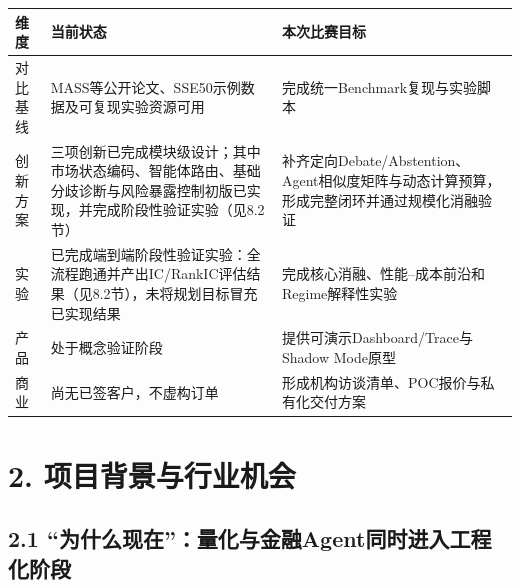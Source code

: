 \documentclass[12pt,a4paper]{ctexart}
\begin{document}
\begin{longtable}[]{@{}
  >{\raggedright\arraybackslash}p{}
  >{\raggedright\arraybackslash}p{}
  >{\raggedright\arraybackslash}p{}@{}}
\toprule\noalign{}
\begin{minipage}[b]{\linewidth}\centering
\textbf{维度}
\end{minipage} & \begin{minipage}[b]{\linewidth}\centering
\textbf{当前状态}
\end{minipage} & \begin{minipage}[b]{\linewidth}\centering
\textbf{本次比赛目标}
\end{minipage} \\
\midrule\noalign{}
\endhead
\bottomrule\noalign{}
\endlastfoot
对比基线 & MASS等公开论文、SSE50示例数据及可复现实验资源可用 &
完成统一Benchmark复现与实验脚本 \\
创新方案 &
三项创新已完成模块级设计；其中市场状态编码、智能体路由、基础分歧诊断与风险暴露控制初版已实现，并完成阶段性验证实验（见8.2节）
&
补齐定向Debate/Abstention、Agent相似度矩阵与动态计算预算，形成完整闭环并通过规模化消融验证 \\
实验 &
已完成端到端阶段性验证实验：全流程跑通并产出IC/RankIC评估结果（见8.2节），未将规划目标冒充已实现结果
& 完成核心消融、性能--成本前沿和Regime解释性实验 \\
产品 & 处于概念验证阶段 & 提供可演示Dashboard/Trace与Shadow Mode原型 \\
商业 & 尚无已签客户，不虚构订单 &
形成机构访谈清单、POC报价与私有化交付方案 \\
\end{longtable}

\section{\texorpdfstring{\textbf{2.
项目背景与行业机会}}{2. 项目背景与行业机会}}\label{ux9879ux76eeux80ccux666fux4e0eux884cux4e1aux673aux4f1a}

\subsection{\texorpdfstring{\textbf{2.1
``为什么现在''：量化与金融Agent同时进入工程化阶段}}{2.1 ``为什么现在''：量化与金融Agent同时进入工程化阶段}}\label{ux4e3aux4ec0ux4e48ux73b0ux5728ux91cfux5316ux4e0eux91d1ux878dagentux540cux65f6ux8fdbux5165ux5de5ux7a0bux5316ux9636ux6bb5}
\end{document}
